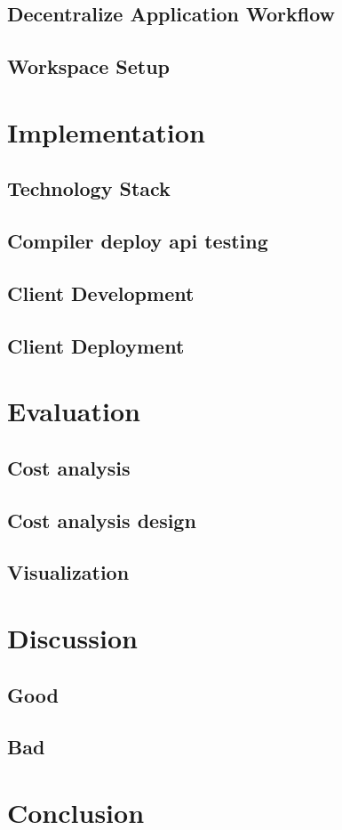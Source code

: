 \documentclass [12pt]{article}
\begin{document}
\subsection{Decentralize Application Workflow }

\subsection{Workspace Setup}
\section{Implementation}
\subsection{Technology Stack}
\subsection{Compiler deploy api testing}
\subsection{Client Development}
\subsection{Client Deployment}
\section{Evaluation}
\subsection{Cost analysis}
\subsection{Cost analysis design}
\subsection{Visualization}
\section{Discussion}
\subsection{Good}
\subsection{Bad}
\section{Conclusion}


\end{document}
